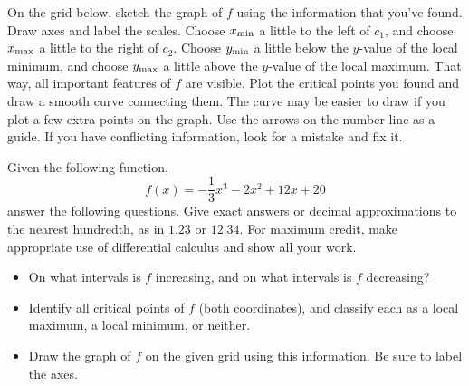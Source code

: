 \begin{ProblemSet}
 \begin{Problem}
  On the grid below, sketch the graph of $f$ using the information that you've found.
  Draw axes and label the scales.
  Choose $x_\mathrm{min}$ a little to the left of $c_1$, and choose $x_\mathrm{max}$ a little to the right of $c_2$.
  Choose $y_\mathrm{min}$ a little below the $y$-value of the local minimum, and choose $y_\mathrm{max}$ a little above the $y$-value of the local maximum.
  That way, all important features of $f$ are visible.
  Plot the critical points you found and draw a smooth curve connecting them.
  The curve may be easier to draw if you plot a few extra points on the graph.
  Use the arrows on the number line as a guide.
  If you have conflicting information, look for a mistake and fix it.

  \bigskip
  \GraphingGrid

 \end{Problem}
\end{ProblemSet}

\newpage

Given the following function,
\begin{equation*}
 f(x) = -\frac{1}{3} x^3 - 2 x^2 + 12 x + 20
\end{equation*}
answer the following questions.
Give exact answers or decimal approximations to the nearest hundredth, as in $1.23$ or $12.34$.
For maximum credit, make appropriate use of differential calculus and show all your work.

\begin{itemize}
\item On what intervals is $f$ increasing, and on what intervals is $f$ decreasing?
\item Identify all critical points of $f$ (both coordinates), and classify each as a local maximum, a local minimum, or neither.
\item Draw the graph of $f$ on the given grid using this information.
 Be sure to label the axes.

\end{itemize}

\bigskip
\GraphingGrid

